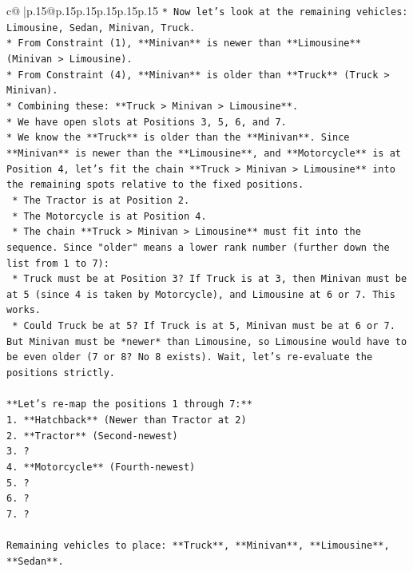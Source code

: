 \documentclass{article}
\begin{document}
{\begin{supertabular}{c@{$\;$}|p{.15\linewidth}@{}p{.15\linewidth}p{.15\linewidth}p{.15\linewidth}p{.15\linewidth}p{.15\linewidth}}
{{{\texttt{*   Now let's look at the remaining vehicles: Limousine, Sedan, Minivan, Truck.} \\
\texttt{*   From Constraint (1), **Minivan** is newer than **Limousine** (Minivan > Limousine).} \\
\texttt{*   From Constraint (4), **Minivan** is older than **Truck** (Truck > Minivan).} \\
\texttt{*   Combining these: **Truck > Minivan > Limousine**.} \\
\texttt{*   We have open slots at Positions 3, 5, 6, and 7.} \\
\texttt{*   We know the **Truck** is older than the **Minivan**. Since **Minivan** is newer than the **Limousine**, and **Motorcycle** is at Position 4, let's fit the chain **Truck > Minivan > Limousine** into the remaining spots relative to the fixed positions.} \\
\texttt{    *   The Tractor is at Position 2.} \\
\texttt{    *   The Motorcycle is at Position 4.} \\
\texttt{    *   The chain **Truck > Minivan > Limousine** must fit into the sequence. Since "older" means a lower rank number (further down the list from 1 to 7):} \\
\texttt{        *   Truck must be at Position 3? If Truck is at 3, then Minivan must be at 5 (since 4 is taken by Motorcycle), and Limousine at 6 or 7. This works.} \\
\texttt{        *   Could Truck be at 5? If Truck is at 5, Minivan must be at 6 or 7. But Minivan must be *newer* than Limousine, so Limousine would have to be even older (7 or 8? No 8 exists). Wait, let's re{-}evaluate the positions strictly.} \\
\\ 
\texttt{**Let's re{-}map the positions 1 through 7:**} \\
\texttt{1.  **Hatchback** (Newer than Tractor at 2)} \\
\texttt{2.  **Tractor** (Second{-}newest)} \\
\texttt{3.  ?} \\
\texttt{4.  **Motorcycle** (Fourth{-}newest)} \\
\texttt{5.  ?} \\
\texttt{6.  ?} \\
\texttt{7.  ?} \\
\\ 
\texttt{Remaining vehicles to place: **Truck**, **Minivan**, **Limousine**, **Sedan**.} \\
}}}
\end{supertabular}}
\end{document}
